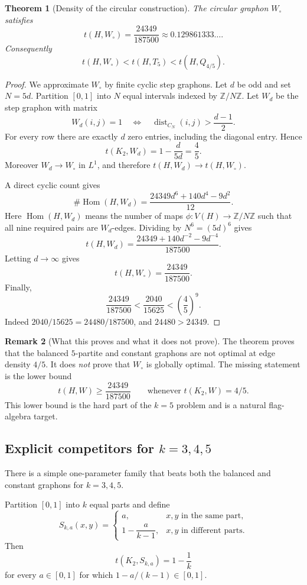 \documentclass[11pt]{amsart}
\newtheorem{theorem}{Theorem}[section]
\theoremstyle{definition}
\newtheorem{remark}[theorem]{Remark}
\newcommand{\1}{\mathbf 1}
\newcommand{\Z}{\mathbb Z}
\newcommand{\dist}{\operatorname{dist}}
\newcommand{\Hom}{\operatorname{Hom}}
\begin{document}
\begin{theorem}[Density of the circular construction]
The circular graphon $W_\circ$ satisfies
\[
   t(H,W_\circ)=\frac{24349}{187500}\approx 0.129861333\ldots .
\]
Consequently
\[
   t(H,W_\circ)<t(H,T_5)<t(H,Q_{4/5}).
\]
\end{theorem}

\begin{proof}
We approximate $W_\circ$ by finite cyclic step graphons.  Let $d$ be odd and set
$N=5d$.  Partition $[0,1]$ into $N$ equal intervals indexed by $\Z/N\Z$.  Let
$W_d$ be the step graphon with matrix
\[
   W_d(i,j)=1\quad\Longleftrightarrow\quad
   \dist_{C_N}(i,j)>\frac{d-1}{2}.
\]
For every row there are exactly $d$ zero entries, including the diagonal entry.
Hence
\[
   t(K_2,W_d)=1-\frac{d}{5d}=\frac45.
\]
Moreover $W_d\to W_\circ$ in $L^1$, and therefore $t(H,W_d)\to t(H,W_\circ)$.

A direct cyclic count gives
\[
   \#\Hom(H,W_d)=\frac{24349d^6+140d^4-9d^2}{12}.
\]
Here $\Hom(H,W_d)$ means the number of maps $\phi:V(H)\to\Z/N\Z$ such that all
nine required pairs are $W_d$-edges.  Dividing by $N^6=(5d)^6$ gives
\[
   t(H,W_d)=\frac{24349+140d^{-2}-9d^{-4}}{187500}.
\]
Letting $d\to\infty$ gives
\[
   t(H,W_\circ)=\frac{24349}{187500}.
\]
Finally,
\[
   \frac{24349}{187500}<\frac{2040}{15625}<\left(\frac45\right)^9.
\]
Indeed $2040/15625=24480/187500$, and $24480>24349$.
\end{proof}

\begin{remark}[What this proves and what it does not prove]
The theorem proves that the balanced $5$-partite and constant graphons are not
optimal at edge density $4/5$.  It does \emph{not} prove that $W_\circ$ is
globally optimal.  The missing statement is the lower bound
\[
   t(H,W)\ge \frac{24349}{187500}\qquad
   \text{whenever }t(K_2,W)=4/5.
\]
This lower bound is the hard part of the $k=5$ problem and is a natural
flag-algebra target.
\end{remark}

\subsection{Explicit competitors for $k=3,4,5$}
\label{ssec:Ska}

There is a simple one-parameter family that beats both the balanced and constant
graphons for $k=3,4,5$.

Partition $[0,1]$ into $k$ equal parts and define
\[
   S_{k,a}(x,y)=
   \begin{cases}
      a, & x,y\text{ in the same part},\\[1mm]
      1-\dfrac{a}{k-1}, & x,y\text{ in different parts}.
   \end{cases}
\]
Then
\[
   t(K_2,S_{k,a})=1-\frac1k
\]
for every $a\in[0,1]$ for which $1-a/(k-1)\in[0,1]$.
\end{document}
